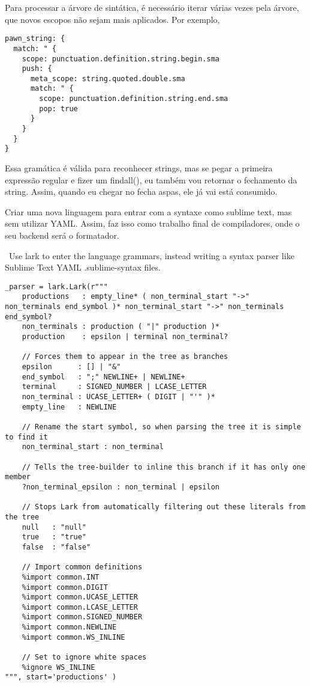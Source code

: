 Para processar a árvore de sintática, é necessário iterar várias vezes pela árvore, que novos escopos não sejam mais aplicados.
Por exemplo,
\begin{lstlisting}
pawn_string: {
  match: " {
    scope: punctuation.definition.string.begin.sma
    push: {
      meta_scope: string.quoted.double.sma
      match: " {
        scope: punctuation.definition.string.end.sma
        pop: true
      }
    }
  }
}
\end{lstlisting}
Essa gramática é válida para reconhecer strings, mas se pegar a primeira expressão
regular e fizer um findall(), eu também vou retornar o fechamento da string.
Assim, quando eu chegar no fecha aspas, ele já vai está consumido.

Criar uma nova linguagem para entrar com a syntaxe como sublime text, mas sem utilizar YAML.
Assim, faz isso como trabalho final de compiladores, onde o seu backend será o formatador.

~Use lark to enter the language grammars, instead writing a syntax parser like Sublime Text YAML .sublime-syntax files.~
\begin{lstlisting}
_parser = lark.Lark(r"""
    productions   : empty_line* ( non_terminal_start "->" non_terminals end_symbol )* non_terminal_start "->" non_terminals end_symbol?
    non_terminals : production ( "|" production )*
    production    : epsilon | terminal non_terminal?

    // Forces them to appear in the tree as branches
    epsilon      : [] | "&"
    end_symbol   : ";" NEWLINE+ | NEWLINE+
    terminal     : SIGNED_NUMBER | LCASE_LETTER
    non_terminal : UCASE_LETTER+ ( DIGIT | "'" )*
    empty_line   : NEWLINE

    // Rename the start symbol, so when parsing the tree it is simple to find it
    non_terminal_start : non_terminal

    // Tells the tree-builder to inline this branch if it has only one member
    ?non_terminal_epsilon : non_terminal | epsilon

    // Stops Lark from automatically filtering out these literals from the tree
    null   : "null"
    true   : "true"
    false  : "false"

    // Import common definitions
    %import common.INT
    %import common.DIGIT
    %import common.UCASE_LETTER
    %import common.LCASE_LETTER
    %import common.SIGNED_NUMBER
    %import common.NEWLINE
    %import common.WS_INLINE

    // Set to ignore white spaces
    %ignore WS_INLINE
""", start='productions' )
\end{lstlisting}


